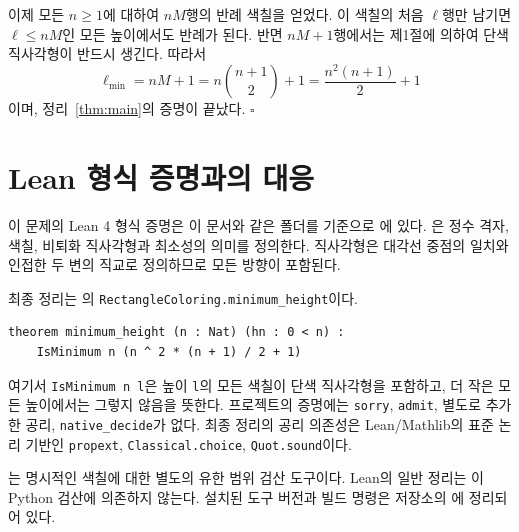 \documentclass[a4paper,11pt]{article}
\theoremstyle{definition}
\begin{document}
이제 모든 $n\ge1$에 대하여 $nM$행의 반례 색칠을 얻었다.
이 색칠의 처음 $\ell$행만 남기면 $\ell\le nM$인 모든 높이에서도 반례가 된다.
반면 $nM+1$행에서는 제1절에 의하여 단색 직사각형이 반드시 생긴다.
따라서
\[
  \boxed{\ell_{\min}=nM+1
  =n\binom{n+1}{2}+1=\frac{n^2(n+1)}2+1}
\]
이며, 정리~\ref{thm:main}의 증명이 끝났다. \hfill$\square$

\clearpage
\section{Lean 형식 증명과의 대응}

이 문제의 Lean 4 형식 증명은 이 문서와 같은 폴더를 기준으로
에 있다.
은 정수 격자, 색칠, 비퇴화 직사각형과 최소성의
의미를 정의한다. 직사각형은 대각선 중점의 일치와 인접한 두 변의
직교로 정의하므로 모든 방향이 포함된다.

최종 정리는 의
\texttt{RectangleColoring.minimum\_height}이다.
\begin{verbatim}
theorem minimum_height (n : Nat) (hn : 0 < n) :
    IsMinimum n (n ^ 2 * (n + 1) / 2 + 1)
\end{verbatim}
여기서 \texttt{IsMinimum n l}은 높이 \texttt{l}의 모든 색칠이 단색
직사각형을 포함하고, 더 작은 모든 높이에서는 그렇지 않음을 뜻한다.
프로젝트의 증명에는 \texttt{sorry}, \texttt{admit}, 별도로 추가한
공리, \texttt{native\_decide}가 없다. 최종 정리의 공리 의존성은
Lean/Mathlib의 표준 논리 기반인 \texttt{propext},
\texttt{Classical.choice}, \texttt{Quot.sound}이다.

는 명시적인 색칠에 대한 별도의 유한 범위 검산 도구이다.
Lean의 일반 정리는 이 Python 검산에 의존하지 않는다.
설치된 도구 버전과 빌드 명령은 저장소의 에 정리되어 있다.
\end{document}
